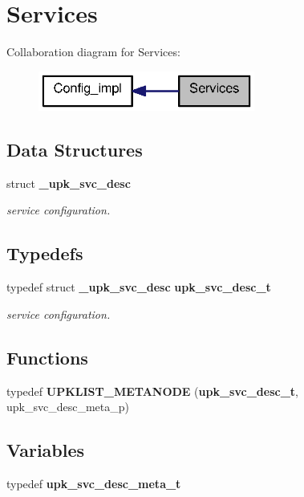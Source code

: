 \section{Services}
\label{group__services}
Collaboration diagram for Services:\nopagebreak
\begin{figure}[H]
\begin{center}
\leavevmode
\includegraphics[width=202pt]{group__services}
\end{center}
\end{figure}
\subsection*{Data Structures}
\begin{DoxyCompactItemize}
\item 
struct {\bf \_\-upk\_\-svc\_\-desc}
\begin{DoxyCompactList}\small\item\em service configuration. \end{DoxyCompactList}\end{DoxyCompactItemize}
\subsection*{Typedefs}
\begin{DoxyCompactItemize}
\item 
typedef struct {\bf \_\-upk\_\-svc\_\-desc} {\bf upk\_\-svc\_\-desc\_\-t}
\begin{DoxyCompactList}\small\item\em service configuration. \end{DoxyCompactList}\end{DoxyCompactItemize}
\subsection*{Functions}
\begin{DoxyCompactItemize}
\item 
typedef {\bf UPKLIST\_\-METANODE} ({\bf upk\_\-svc\_\-desc\_\-t}, upk\_\-svc\_\-desc\_\-meta\_\-p)
\end{DoxyCompactItemize}
\subsection*{Variables}
\begin{DoxyCompactItemize}
\item 
typedef {\bf upk\_\-svc\_\-desc\_\-meta\_\-t}
\end{DoxyCompactItemize}


